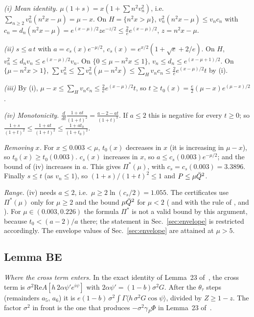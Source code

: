 \emph{(i) Mean identity.} $\mu(1+s)=x(1+\sum n^2v_n^2)$, i.e.\ $\sum_{n\ge2}v_n^2(n^2x-\mu)=\mu-x$.
On $H=\{n^2x>\mu\}$, $v_n^2(n^2x-\mu)\le v_nc_n$ with $c_n=d_n(n^2x-\mu)=e^{(x-\mu)/2}ze^{-z/2}\le\frac2ee^{(x-\mu)/2}$, $z=n^2x-\mu$.

\emph{(ii)} $s\le a\,t$ with $a=c_s(x)e^{-\mu/2}$, $c_s(x)=e^{x/2}(1+\sqrt e+2/e)$.
On $H$, $v_n^2\le d_nv_n\le e^{(x-\mu)/2}v_n$.
On $\{0\le\mu-n^2x\le1\}$, $v_n\le d_n\le e^{(x-\mu+1)/2}$.
On $\{\mu-n^2x>1\}$, $\sum v_n^2\le\sum v_n^2(\mu-n^2x)\le\sum_Hv_nc_n\le\frac2ee^{(x-\mu)/2}t$ by (i).

\emph{(iii)} By (i), $\mu-x\le\sum_Hv_nc_n\le\frac2ee^{(x-\mu)/2}t$, so $t\ge t_0(x)=\frac e2(\mu-x)e^{(\mu-x)/2}$.

\emph{(iv) Monotonicity.} $\frac{d}{dt}\frac{1+at}{(1+t)^2}=\frac{a-2-at}{(1+t)^3}$.
If $a\le2$ this is negative for every $t\ge0$; so $\frac{1+s}{(1+t)^2}\le\frac{1+at}{(1+t)^2}\le\frac{1+at_0}{(1+t_0)^2}$.

\emph{Removing $x$.} For $x\le0.003<\mu$, $t_0(x)$ decreases in $x$ (it is increasing in $\mu-x$), so $t_0(x)\ge t_0(0.003)$.
$c_s(x)$ increases in $x$, so $a\le c_s(0.003)e^{-\mu/2}$; and the bound of (iv) increases in $a$.
This gives $\Pi^*(\mu)$, with $c_s=c_s(0.003)=3.3896$.
Finally $s\le t$ (as $v_n\le1$), so $(1+s)/(1+t)^2\le1$ and $P\le\mu\bar Q^2$.

\emph{Range.} (iv) needs $a\le2$, i.e.\ $\mu\ge2\ln(c_s/2)=1.055$.
The certificates use $\Pi^*(\mu)$ only for $\mu\ge2$ and the bound $\mu\bar Q^2$ for $\mu<2$ ( and  with the rule of , and ).
For $\mu\in(0.003,0.226)$ the formula $\Pi^*$ is not a valid bound by this argument, because $t_0<(a-2)/a$ there; the statement in Sec.~\ref{sec:envelope} is restricted accordingly.
The envelope values of Sec.~\ref{sec:envelope} are attained at $\mu>5$.

\subsection{Lemma BE}
\label{app:details:BE}
\emph{Where the cross term enters.} In the exact identity of Lemma~23 of~\cite{F}, the cross term is $\sigma^2\mathrm{Re}A[h\,2\alpha\psi'e^{i\psi}]$ with $2\alpha\psi'=(1-b)\sigma^2G$.
After the $\theta_\tau$ steps (remainders $a_5$, $a_6$) it is $e(1-b)\,\sigma^2\int\Gamma\langle h\,\sigma^2G\cos\psi\rangle$, divided by $Z\ge1-z$.
The factor $\sigma^2$ in front is the one that produces $-\sigma^2\gamma_P\Phi$ in Lemma~23 of~\cite{F}.

